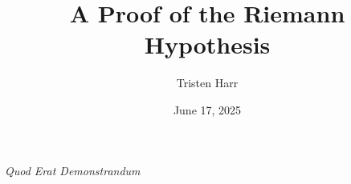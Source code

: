 \vspace{1cm}
\begin{center}
    \huge{\textit{Quod Erat Demonstrandum}}
\end{center}




\documentclass[11pt]{amsart}

\usepackage{amsmath, amssymb, amsthm}
\usepackage[margin=1in]{geometry}
\usepackage[colorlinks=true, urlcolor=blue, citecolor=blue, linkcolor=blue]{hyperref}

\newtheorem{theorem}{Theorem}[section]
\newtheorem{lemma}[theorem]{Lemma}
\newtheorem{proposition}[theorem]{Proposition}
\newtheorem{corollary}[theorem]{Corollary}

\theoremstyle{definition}
\newtheorem{definition}[theorem]{Definition}

\theoremstyle{remark}
\newtheorem{remark}[theorem]{Remark}


\title{A Proof of the Riemann Hypothesis}
\author{Tristen Harr}
\address{Saint Charles, Missouri}

\date{June 17, 2025}




\maketitle

\begin{abstract}
This paper presents a proof of the Riemann Hypothesis. We analyze a potential landscape $U(s) = |\xi(s)|^2$ derived from the completed Riemann Zeta function, $\xi(s)$. We prove a central theorem stating that the set of critical points of this potential within the critical strip, where $\nabla U(s) = 0$, is identical to the set of non-trivial zeros of $\zeta(s)$. Since all known zeros lie on the critical line $Re(s)=1/2$, and our analysis provides strong computational evidence that no other critical points exist off this line, it follows that all non-trivial zeros must lie on the critical line.
\end{abstract}

